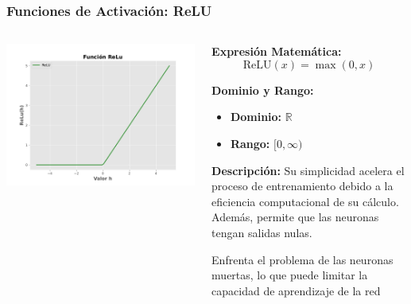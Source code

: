 \begin{frame}
	\frametitle{Funciones de Activación: ReLU}
	\begin{columns}
		
		\begin{column}{0.5\textwidth} %
			\includegraphics[width=\textwidth]{img/relu.pdf} %
		\end{column}
		
		 \begin{column}{0.5\textwidth} %
			\textbf{Expresión Matemática:}
			\[ \text{ReLU}(x) = \max(0, x) \]
			
			\textbf{Dominio y Rango:}
			\begin{itemize}
				\item \textbf{Dominio:} $\mathbb{R}$ 
				\item \textbf{Rango:} $[0, \infty)$
			\end{itemize}
			
			\textbf{Descripción:} {\normalsize Su simplicidad acelera el proceso de entrenamiento debido a la eficiencia computacional de su cálculo. Además, permite que las neuronas tengan salidas nulas.}
			
			{\normalsize Enfrenta el problema de las neuronas muertas, lo que puede limitar la capacidad de aprendizaje de la red}
		\end{column}
		
	\end{columns}
	
\end{frame}



